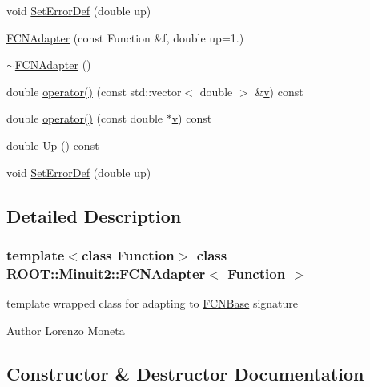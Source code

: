 \begin{DoxyCompactItemize}
\item 
void \mbox{\hyperlink{classROOT_1_1Minuit2_1_1FCNAdapter_ad87419db3f1d4764497f52487fef6fc8}{Set\+Error\+Def}} (double up)
\item 
\mbox{\hyperlink{classROOT_1_1Minuit2_1_1FCNAdapter_a0cd70aee01a37c53792062b4118588dc}{F\+C\+N\+Adapter}} (const Function \&f, double up=1.)
\item 
\mbox{\hyperlink{classROOT_1_1Minuit2_1_1FCNAdapter_a6d8b1c24b52ec333fca9cc854533a777}{$\sim$\+F\+C\+N\+Adapter}} ()
\item 
double \mbox{\hyperlink{classROOT_1_1Minuit2_1_1FCNAdapter_a3d400764a6828594b68a00b905d450b2}{operator()}} (const std\+::vector$<$ double $>$ \&\mbox{\hyperlink{adat__devel_2lib_2hadron_2hadron__timeslice_8cc_a716fc87f5e814be3ceee2405ed6ff22a}{v}}) const
\item 
double \mbox{\hyperlink{classROOT_1_1Minuit2_1_1FCNAdapter_a9321402d626f4bdfbdbef3b63d452daf}{operator()}} (const double $\ast$\mbox{\hyperlink{adat__devel_2lib_2hadron_2hadron__timeslice_8cc_a716fc87f5e814be3ceee2405ed6ff22a}{v}}) const
\item 
double \mbox{\hyperlink{classROOT_1_1Minuit2_1_1FCNAdapter_a3bcb29efda3b97c17bb17512c1629365}{Up}} () const
\item 
void \mbox{\hyperlink{classROOT_1_1Minuit2_1_1FCNAdapter_ad87419db3f1d4764497f52487fef6fc8}{Set\+Error\+Def}} (double up)
\end{DoxyCompactItemize}


\subsection{Detailed Description}
\subsubsection*{template$<$class Function$>$\newline
class R\+O\+O\+T\+::\+Minuit2\+::\+F\+C\+N\+Adapter$<$ Function $>$}

template wrapped class for adapting to \mbox{\hyperlink{classROOT_1_1Minuit2_1_1FCNBase}{F\+C\+N\+Base}} signature

\begin{DoxyAuthor}{Author}
Lorenzo Moneta 
\end{DoxyAuthor}


\subsection{Constructor \& Destructor Documentation}
\mbox{\label{classROOT_1_1Minuit2_1_1FCNAdapter_a0cd70aee01a37c53792062b4118588dc}} 

